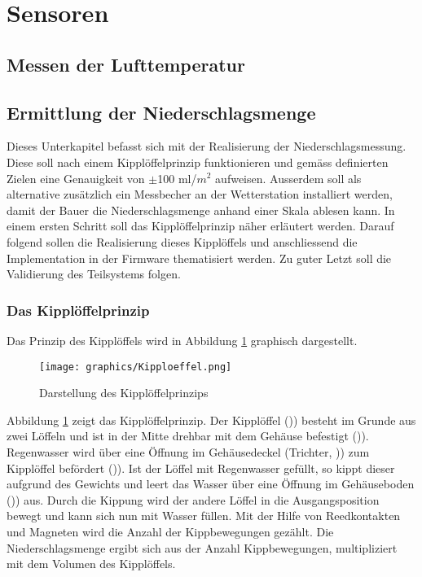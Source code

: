 \section{Sensoren}


\subsection{Messen der Lufttemperatur}
\subsection{Ermittlung der Niederschlagsmenge}
Dieses Unterkapitel befasst sich mit der Realisierung der Niederschlagsmessung. Diese soll nach einem Kipplöffelprinzip funktionieren und gemäss definierten Zielen eine Genauigkeit von $\pm$100 ml/$m^2$ aufweisen. Ausserdem soll als alternative zusätzlich ein Messbecher an der Wetterstation installiert werden, damit der Bauer die Niederschlagsmenge anhand einer Skala ablesen kann. In einem ersten Schritt soll das Kipplöffelprinzip näher erläutert werden. Darauf folgend sollen die Realisierung dieses Kipplöffels und anschliessend die Implementation in der Firmware thematisiert werden. Zu guter Letzt soll die Validierung des Teilsystems folgen.
\subsubsection*{Das Kipplöffelprinzip}
Das Prinzip des Kipplöffels wird in Abbildung \ref{fig:Kipp} graphisch dargestellt.

\begin{figure}[h]
\centering
\texttt{[image: graphics/Kipploeffel.png]}
\caption{Darstellung des Kipplöffelprinzips}
\label{fig:Kipp}
\end{figure}

Abbildung \ref{fig:Kipp} zeigt das Kipplöffelprinzip. Der Kipplöffel ()\grqq) besteht im Grunde aus zwei Löffeln und ist in der Mitte drehbar mit dem Gehäuse befestigt ()\grqq). Regenwasser wird über eine Öffnung im Gehäusedeckel (Trichter, )\grqq) zum Kipplöffel befördert ()\grqq). Ist der Löffel mit Regenwasser gefüllt, so kippt dieser aufgrund des Gewichts und leert das Wasser über eine Öffnung im Gehäuseboden ()\grqq) aus. Durch die Kippung wird der andere Löffel in die Ausgangsposition bewegt und kann sich nun mit Wasser füllen. Mit der Hilfe von Reedkontakten und Magneten wird die Anzahl der Kippbewegungen gezählt. Die Niederschlagsmenge ergibt sich aus der Anzahl Kippbewegungen, multipliziert mit dem Volumen des Kipplöffels.
